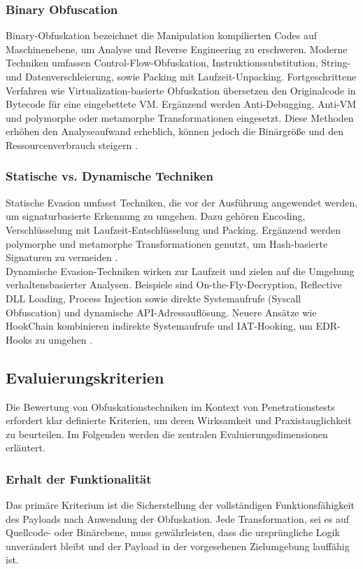\subsubsection{Binary Obfuscation}
Binary-Obfuskation bezeichnet die Manipulation kompilierten Codes auf Maschinenebene, um Analyse und Reverse Engineering zu erschweren. Moderne Techniken umfassen Control-Flow-Obfuskation, Instruktionssubstitution, String- und Datenverschleierung, sowie Packing mit Laufzeit-Unpacking. Fortgeschrittene Verfahren wie Virtualization-basierte Obfuskation übersetzen den Originalcode in Bytecode für eine eingebettete VM. Ergänzend werden Anti-Debugging, Anti-VM und polymorphe oder metamorphe Transformationen eingesetzt. Diese Methoden erhöhen den Analyseaufwand erheblich, können jedoch die Binärgröße und den Ressourcenverbrauch steigern \cite{vmray2024obfuscation}.
\subsubsection{Statische vs. Dynamische Techniken}
Statische Evasion umfasst Techniken, die vor der Ausführung angewendet werden, um signaturbasierte Erkennung zu umgehen. Dazu gehören Encoding, Verschlüsselung mit Laufzeit-Entschlüsselung und Packing. Ergänzend werden polymorphe und metamorphe Transformationen genutzt, um Hash-basierte Signaturen zu vermeiden \cite{case2024edr}.\\
Dynamische Evasion-Techniken wirken zur Laufzeit und zielen auf die Umgehung verhaltensbasierter Analysen. Beispiele sind On-the-Fly-Decryption, Reflective DLL Loading, Process Injection sowie direkte Systemaufrufe (Syscall Obfuscation) und dynamische API-Adressauflösung. Neuere Ansätze wie HookChain kombinieren indirekte Systemaufrufe und IAT-Hooking, um EDR-Hooks zu umgehen \cite{carvalho2024hookchain}.
\subsection{Evaluierungskriterien}
Die Bewertung von Obfuskationstechniken im Kontext von Penetrationstests erfordert klar definierte Kriterien, um deren Wirksamkeit und Praxistauglichkeit zu beurteilen. Im Folgenden werden die zentralen Evaluierungsdimensionen erläutert.
\subsubsection{Erhalt der Funktionalität}
Das primäre Kriterium ist die Sicherstellung der vollständigen Funktionsfähigkeit des Payloads nach Anwendung der Obfuskation. Jede Transformation, sei es auf Quellcode- oder Binärebene, muss gewährleisten, dass die ursprüngliche Logik unverändert bleibt und der Payload in der vorgesehenen Zielumgebung lauffähig ist.
